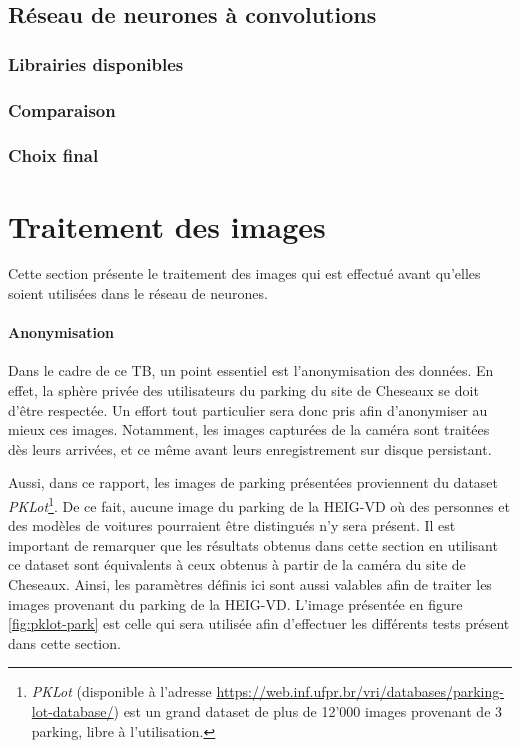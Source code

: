 \subsection{Réseau de neurones à convolutions}
\subsubsection{Librairies disponibles}
\subsubsection{Comparaison}
\subsubsection{Choix final}

\section{Traitement des images}\label{conception.traitement}
Cette section présente le traitement des images qui est effectué avant qu'elles soient utilisées dans le réseau de neurones. 

\paragraph{Anonymisation}
Dans le cadre de ce TB, un point essentiel est l'anonymisation des données. En effet, la sphère privée des utilisateurs du parking du site de Cheseaux se doit d'être respectée. Un effort tout particulier sera donc pris afin d'anonymiser au mieux ces images. Notamment, les images capturées de la caméra sont traitées dès leurs arrivées, et ce même avant leurs enregistrement sur disque persistant. 

Aussi, dans ce rapport, les images de parking présentées proviennent du dataset \textit{PKLot}\footnote{\textit{PKLot} (disponible à l'adresse \url{https://web.inf.ufpr.br/vri/databases/parking-lot-database/}) est un grand dataset de plus de 12'000 images provenant de 3 parking, libre à l'utilisation.\autocite{paper:pklot}}. De ce fait, aucune image du parking de la HEIG-VD où des personnes et des modèles de voitures pourraient être distingués n'y sera présent. Il est important de remarquer que les résultats obtenus dans cette section en utilisant ce dataset sont équivalents à ceux obtenus à partir de la caméra du site de Cheseaux. Ainsi, les paramètres définis ici sont aussi valables afin de traiter les images provenant du parking de la HEIG-VD. L'image présentée en figure \ref{fig:pklot-park} est celle qui sera utilisée afin d'effectuer les différents tests présent dans cette section.

